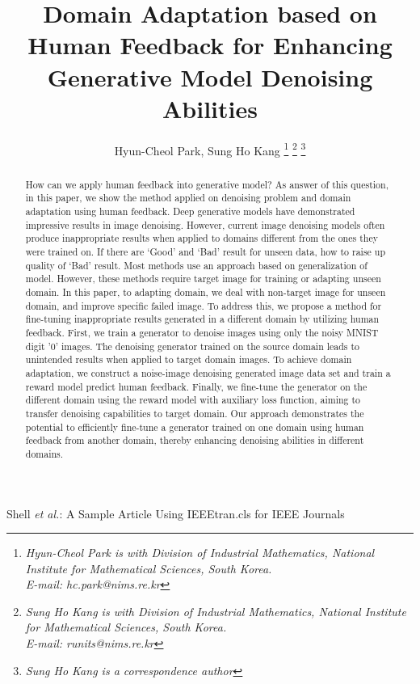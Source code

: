 \documentclass[lettersize,journal]{IEEEtran}
\begin{document}
\title{Domain Adaptation based on Human Feedback for Enhancing Generative Model Denoising Abilities}

\author{Hyun-Cheol Park, Sung Ho Kang
\thanks{\textit{Hyun-Cheol Park is with Division of Industrial Mathematics, National Institute for Mathematical Sciences, South Korea. \\ E-mail: hc.park@nims.re.kr}}%
\thanks{\textit{Sung Ho Kang is with Division of Industrial Mathematics, National Institute for Mathematical Sciences, South Korea. \\ E-mail: runits@nims.re.kr}}
\thanks{\textit{Sung Ho Kang is a correspondence author}}}
%
{Shell \MakeLowercase{\textit{et al.}}: A Sample Article Using IEEEtran.cls for IEEE Journals}


\maketitle

\begin{abstract}
How can we apply human feedback into generative model? As answer of this question, in this paper, we show the method applied on denoising problem and domain adaptation using human feedback. Deep generative models have demonstrated impressive results in image denoising. However, current image denoising models often produce inappropriate results when applied to domains different from the ones they were trained on. If there are `Good' and `Bad' result for unseen data, how to raise up quality of `Bad' result. Most methods use an approach based on generalization of model. However, these methods require target image for training or adapting unseen domain. In this paper, to adapting domain, we deal with non-target image for unseen domain, and improve specific failed image. To address this, we propose a method for fine-tuning inappropriate results generated in a different domain by utilizing human feedback. First, we train a generator to denoise images using only the noisy MNIST digit '0' images. The denoising generator trained on the source domain leads to unintended results when applied to target domain images. To achieve domain adaptation, we construct a noise-image denoising generated image data set and train a reward model predict human feedback. Finally, we fine-tune the generator on the different domain using the reward model with auxiliary loss function, aiming to transfer denoising capabilities to target domain. Our approach demonstrates the potential to efficiently fine-tune a generator trained on one domain using human feedback from another domain, thereby enhancing denoising abilities in different domains.
\end{abstract}
\end{document}
